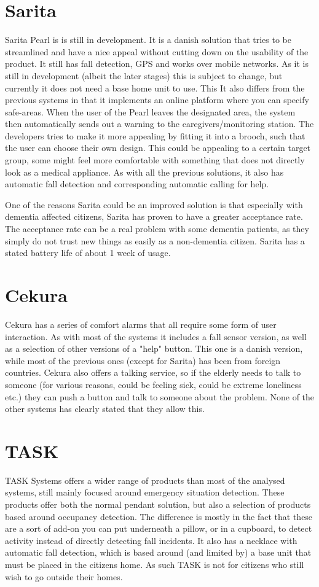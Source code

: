 \section{Sarita}
Sarita Pearl is is still in development. It is a danish solution that tries to be streamlined and have a nice appeal without cutting down on the usability of the product. It still has fall detection, GPS and works over mobile networks. As it is still in development (albeit the later stages) this is subject to change, but currently it does not need a base home unit to use. This It also differs from the previous systems in that it implements an online platform where you can specify safe-areas. When the user of the Pearl leaves the designated area, the system then automatically sends out a warning to the caregivers/monitoring station. The developers tries to make it more appealing by fitting it into a brooch, such that the user can choose their own design. This could be appealing to a certain target group, some might feel more comfortable with something that does not directly look as a medical appliance. As with all the previous solutions, it also has automatic fall detection and corresponding automatic calling for help. 

One of the reasons Sarita could be an improved solution is that especially with dementia affected citizens, Sarita has proven to have a greater acceptance rate. The acceptance rate can be a real problem with some dementia patients, as they simply do not trust new things as easily as a non-dementia citizen.
Sarita has a stated battery life of about 1 week of usage. 


\section{Cekura}
Cekura has a series of comfort alarms that all require some form of user interaction. As with most of the systems it includes a fall sensor version, as well as a selection of other versions of a "help" button. This one is a danish version, while most of the previous ones (except for Sarita) has been from foreign countries. Cekura also offers a talking service, so if the elderly needs to talk to someone (for various reasons, could be feeling sick, could be extreme loneliness etc.) they can push a button and talk to someone about the problem. None of the other systems has clearly stated that they allow this.

\section{TASK}
TASK Systems offers a wider range of products than most of the analysed systems, still mainly focused around emergency situation detection. These products offer both the normal pendant solution, but also a selection of products based around occupancy detection. The difference is mostly in the fact that these are a sort of add-on you can put underneath a pillow, or in a cupboard, to detect activity instead of directly detecting fall incidents. It also has a necklace with automatic fall detection, which is based around (and limited by) a base unit that must be placed in the citizens home. As such TASK is not for citizens who still wish to go outside their homes.

